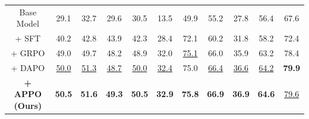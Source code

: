 \begin{table}[h]
{\begin{tabular}{c|cccc|cc|c|c|c|c}
Base Model & 29.1 & 32.7 & 29.6 & 30.5 & 13.5 & 49.9 & 55.2 & 27.8 & 56.4 & 67.6 \\
+ SFT & 40.2 & 42.8 & 43.9 & 42.3 & 28.4 & 72.1 & 60.2 & 31.8 & 58.2 & 72.4 \\
+ GRPO & 49.0 & 49.7 & 48.2 & 48.9 & 32.0 & \underline{75.1} & 66.0 & 35.9 & 63.2 & 78.4 \\
+ DAPO & \underline{50.0} & \underline{51.3} & \underline{48.7} & \underline{50.0} & \underline{32.4} & 75.0 & \underline{66.4} & \underline{36.6} & \underline{64.2} & \textbf{79.9} \\
\midrule
\rowcolor{ModelGreen}\textbf{+ APPO (Ours)} & \textbf{50.5} & \textbf{51.6} & \textbf{49.3} & \textbf{50.5} & \textbf{32.9} & \textbf{75.8} & \textbf{66.9} & \textbf{36.9} & \textbf{64.6} & \underline{79.6} \\
\bottomrule
\end{tabular}
}
\vspace{-0.5em}
\label{tab:main}
\end{table}
